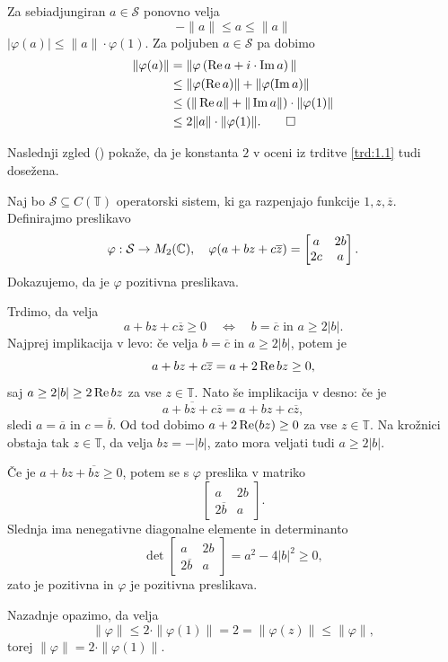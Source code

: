 \begin{dokaz}
    Za sebiadjungiran $a \in \mathcal{S}$ ponovno velja
    $$-\| a\| \leq a \leq \| a\|$$
    $| \varphi (a)| \leq \| a \| \cdot \varphi (1)$.
    Za poljuben $a \in \mathcal{S}$ pa dobimo 
    \begin{align*}
        \| \varphi(a)\| &= \| \varphi \left(\operatorname{Re} a + i \cdot \operatorname{Im} a\right) \| \\
        &\leq \| \varphi (\operatorname{Re} a)\| + \| \varphi (\operatorname{Im} a)\| \\
        &\leq (\| \operatorname{Re} a\| + \| \operatorname{Im} a \|)\cdot \|\varphi (1)\| \\
        &\leq 2 \| a \| \cdot \| \varphi(1)\|. \qedhere
    \end{align*}
\end{dokaz}

Naslednji zgled (\cite[Appendix A.2, str. 221]{arveson1969}) pokaže, da je konstanta $2$ v oceni iz trditve \ref{trd:1.1} tudi dosežena.
\begin{zgled}[Arveson]\label{zgl:1.6}
    Naj bo $\mathcal{S} \subseteq C(\mathbb{T})$ operatorski sistem, ki ga razpenjajo funkcije $1, z, \overline{z}$.
    Definirajmo preslikavo
    $$\varphi: \mathcal{S} \to M_2 (\mathbb C), \quad \varphi (a + bz + c \overline{z}) = \begin{bmatrix}
        a & 2b\\
        2c & a
    \end{bmatrix}.$$
    Dokazujemo, da je $\varphi$ pozitivna preslikava.
    
    Trdimo, da velja 
    $$a + bz + c \overline{z} \geq 0 \quad \Leftrightarrow \quad \text{$b = \overline{c}$ in $a \geq 2|b|$}.$$
    Najprej implikacija v levo: če velja $b = \overline{c}$ in $a \geq 2|b|$, potem je 
    $$a + bz + c \overline{z} = a + 2\operatorname{Re}{bz} \geq 0,$$
    saj $a \geq 2|b| \geq 2 \operatorname{Re}{bz}$ za vse $z \in \mathbb{T}$.
    Nato še implikacija v desno: če je 
    $$\overline{a + bz + c \overline{z}} = a + bz + c \overline{z},$$
    sledi $a = \overline{a}$ in $c = \overline{b}$. Od tod dobimo
    $a + 2 \operatorname{Re} (bz) \geq 0$ za vse $z \in \mathbb{T}$. Na krožnici obstaja tak $z \in \mathbb{T}$,
    da velja $bz = - |b|$, zato mora veljati tudi $a \geq 2 |b|$. 
    
    Če je $a + bz + \overline{bz} \geq 0$, potem se s 
    $\varphi$ preslika v matriko
    $$\begin{bmatrix}
        a & 2b\\
        2\overline{b} & a
    \end{bmatrix}.$$
    Slednja ima nenegativne diagonalne elemente in determinanto
    $$\det \begin{bmatrix}
        a & 2b\\
        2\overline{b} & a
    \end{bmatrix} = a^2 - 4 |b|^2 \geq 0,$$
    zato je pozitivna in $\varphi$ je pozitivna preslikava.
    
    Nazadnje opazimo, da velja
    $$\| \varphi \| \leq 2 \cdot \| \varphi(1) \| = 2 = \| \varphi(z)\| \leq \| \varphi\|,$$
    torej $\| \varphi \| = 2 \cdot \| \varphi(1)\|$.
\end{zgled}

